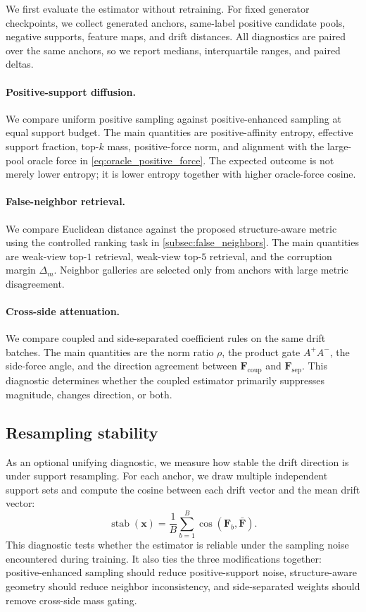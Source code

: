 \documentclass{article}
\newcommand{\F}{\mathbf{F}}
\newcommand{\x}{\mathbf{x}}
\newcommand{\Apos}{A^{+}}
\newcommand{\Aneg}{A^{-}}
\newcommand{\sep}{\mathrm{sep}}
\newcommand{\coup}{\mathrm{coup}}
\begin{document}
We first evaluate the estimator without retraining.
For fixed generator checkpoints, we collect generated anchors, same-label positive candidate pools, negative supports, feature maps, and drift distances.
All diagnostics are paired over the same anchors, so we report medians, interquartile ranges, and paired deltas.

\paragraph{Positive-support diffusion.}
We compare uniform positive sampling against positive-enhanced sampling at equal support budget.
The main quantities are positive-affinity entropy, effective support fraction, top-$k$ mass, positive-force norm, and alignment with the large-pool oracle force in \cref{eq:oracle_positive_force}.
The expected outcome is not merely lower entropy; it is lower entropy together with higher oracle-force cosine.

\paragraph{False-neighbor retrieval.}
We compare Euclidean distance against the proposed structure-aware metric using the controlled ranking task in \cref{subsec:false_neighbors}.
The main quantities are weak-view top-$1$ retrieval, weak-view top-$5$ retrieval, and the corruption margin $\Delta_m$.
Neighbor galleries are selected only from anchors with large metric disagreement.

\paragraph{Cross-side attenuation.}
We compare coupled and side-separated coefficient rules on the same drift batches.
The main quantities are the norm ratio $\rho$, the product gate $\Apos\Aneg$, the side-force angle, and the direction agreement between $\F_{\coup}$ and $\F_{\sep}$.
This diagnostic determines whether the coupled estimator primarily suppresses magnitude, changes direction, or both.

\subsection{Resampling stability}
\label{subsec:resampling_stability}

As an optional unifying diagnostic, we measure how stable the drift direction is under support resampling.
For each anchor, we draw multiple independent support sets and compute the cosine between each drift vector and the mean drift vector:
\begin{equation}
\operatorname{stab}(\x)
=
\frac{1}{B}
\sum_{b=1}^{B}
\cos(\F_b,\bar{\F}).
\label{eq:resampling_stability}
\end{equation}
This diagnostic tests whether the estimator is reliable under the sampling noise encountered during training.
It also ties the three modifications together: positive-enhanced sampling should reduce positive-support noise, structure-aware geometry should reduce neighbor inconsistency, and side-separated weights should remove cross-side mass gating.
\end{document}

